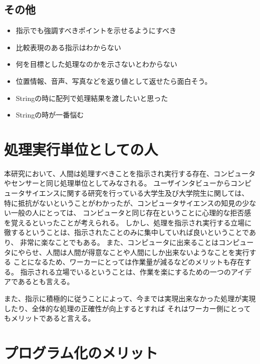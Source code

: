 \subsection{その他}\label{ux305dux306eux4ed6}

\begin{itemize}
\item
  指示でも強調すべきポイントを示せるようにすべき
\item
  比較表現のある指示はわからない
\item
  何を目標とした処理なのかを示さないとわからない
\item
  位置情報、音声、写真などを返り値として返せたら面白そう。
\item
  Stringの時に配列で処理結果を渡したいと思った
\item
  Stringの時が一番悩む
\end{itemize}

\section{処理実行単位としての人}\label{ux51e6ux7406ux5b9fux884cux5358ux4f4dux3068ux3057ux3066ux306eux4eba}

本研究において、人間は処理すべきことを指示され実行する存在、コンピュータやセンサーと同じ処理単位としてみなされる。
ユーザインタビューからコンピュータサイエンスに関する研究を行っている大学生及び大学院生に関しては、
特に抵抗がないということがわかったが、コンピュータサイエンスの知見の少ない一般の人にとっては、
コンピュータと同じ存在ということに心理的な拒否感を覚えるといったことが考えられる。
しかし、処理を指示され実行する立場に徹するということは、指示されたことのみに集中していれば良いということであり、
非常に楽なことでもある。
また、コンピュータに出来ることはコンピュータにやらせ、人間は人間が得意なことや人間にしか出来ないようなことを実行する
ことになるため、ワーカーにとっては作業量が減るなどのメリットも存在する。
指示される立場でいるということは、作業を楽にするための一つのアイデアであるとも言える。

また、指示に積極的に従うことによって、今までは実現出来なかった処理が実現したり、全体的な処理の正確性が向上するとすれば
それはワーカー側にとってもメリットであると言える。

\section{プログラム化のメリット}\label{ux30d7ux30edux30b0ux30e9ux30e0ux5316ux306eux30e1ux30eaux30c3ux30c8}

